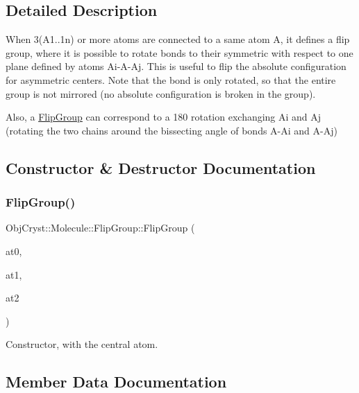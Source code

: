 \subsection{Detailed Description}
When 3(A1..1n) or more atoms are connected to a same atom A, it defines a \textquotesingle{}flip\textquotesingle{} group, where it is possible to rotate bonds to their symmetric with respect to one plane defined by atoms Ai-\/\+A-\/\+Aj. This is useful to flip the absolute configuration for asymmetric centers. Note that the bond is only rotated, so that the entire group is not mirrored (no absolute configuration is broken in the group).

Also, a \mbox{\hyperlink{struct_obj_cryst_1_1_molecule_1_1_flip_group}{Flip\+Group}} can correspond to a 180{\ucr} rotation exchanging Ai and Aj (rotating the two chains around the bissecting angle of bonds A-\/\+Ai and A-\/\+Aj) 

\subsection{Constructor \& Destructor Documentation}
\mbox{\label{struct_obj_cryst_1_1_molecule_1_1_flip_group_ac065fb88e47795199d5e0c12dd53b839}} 
\subsubsection{\texorpdfstring{FlipGroup()}{FlipGroup()}}
{\footnotesize\ttfamily Obj\+Cryst\+::\+Molecule\+::\+Flip\+Group\+::\+Flip\+Group (\begin{DoxyParamCaption}\item[{const \mbox{\hyperlink{class_obj_cryst_1_1_mol_atom}{Mol\+Atom}} \&}]{at0,  }\item[{const \mbox{\hyperlink{class_obj_cryst_1_1_mol_atom}{Mol\+Atom}} \&}]{at1,  }\item[{const \mbox{\hyperlink{class_obj_cryst_1_1_mol_atom}{Mol\+Atom}} \&}]{at2 }\end{DoxyParamCaption})}

Constructor, with the central atom. 

\subsection{Member Data Documentation}
\mbox{\label{struct_obj_cryst_1_1_molecule_1_1_flip_group_ac957576c4d555f0f32d76fedf11d1c3d}} 

